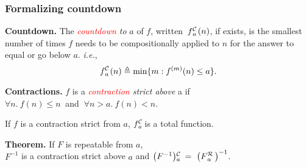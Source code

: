 \begin{frame}
\frametitle{Formalizing countdown}

%
%
%
%

%
%
%
\textbf{Countdown.} The \textit{\textcolor{red}{countdown} to} $a$ of $f$, written~$\cdt{f}{a}(n)$, if exists, is the smallest number of times $f$ needs to be compositionally applied to
$n$ for the answer to equal or go below $a$. \emph{i.e.},
\begin{equation*}
\cdt{f}{a}(n) \triangleq \min\{m: f^{(m)}(n)\le a \}.
\end{equation*}

\textbf{Contractions.} $f$ is a \emph{\textcolor{red}{contraction} strict above} a if \\
$\forall n.~f(n)\le n~$ and $~\forall n > a.~f(n) < n$.

\smallskip

\pause
If $f$ is a contraction strict from $a$, $\cdt{f}{a}$ is a total function.

\bigskip

\pause
\textbf{Theorem.} If $F$ is repeatable from $a$,\\
$F^{-1}$ is a contraction strict above $a$ and $\cdt{\left(F^{-1}\right)}{a}\ \ = \ \left(\rf{F}{a}\ \right)^{-1}$.

\end{frame}



